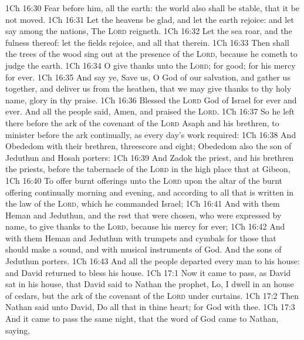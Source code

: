 \vs 1Ch 16:30 Fear before him, all the earth: the world also shall be stable, that it be not moved.
\vs 1Ch 16:31 Let the heavens be glad, and let the earth rejoice: and let  say among the nations, The \textsc{Lord} reigneth.
\vs 1Ch 16:32 Let the sea roar, and the fulness thereof: let the fields rejoice, and all that  therein.
\vs 1Ch 16:33 Then shall the trees of the wood sing out at the presence of the \textsc{Lord}, because he cometh to judge the earth.
\vs 1Ch 16:34 O give thanks unto the \textsc{Lord}; for  good; for his mercy  for ever.
\vs 1Ch 16:35 And say ye, Save us, O God of our salvation, and gather us together, and deliver us from the heathen, that we may give thanks to thy holy name,  glory in thy praise.
\vs 1Ch 16:36 Blessed  the \textsc{Lord} God of Israel for ever and ever. And all the people said, Amen, and praised the \textsc{Lord}.
\vs 1Ch 16:37 So he left there before the ark of the covenant of the \textsc{Lord} Asaph and his brethren, to minister before the ark continually, as every day's work required:
\vs 1Ch 16:38 And Obededom with their brethren, threescore and eight; Obededom also the son of Jeduthun and Hosah  porters:
\vs 1Ch 16:39 And Zadok the priest, and his brethren the priests, before the tabernacle of the \textsc{Lord} in the high place that  at Gibeon,
\vs 1Ch 16:40 To offer burnt offerings unto the \textsc{Lord} upon the altar of the burnt offering continually morning and evening, and  according to all that is written in the law of the \textsc{Lord}, which he commanded Israel;
\vs 1Ch 16:41 And with them Heman and Jeduthun, and the rest that were chosen, who were expressed by name, to give thanks to the \textsc{Lord}, because his mercy  for ever;
\vs 1Ch 16:42 And with them Heman and Jeduthun with trumpets and cymbals for those that should make a sound, and with musical instruments of God. And the sons of Jeduthun  porters.
\vs 1Ch 16:43 And all the people departed every man to his house: and David returned to bless his house.
\vs 1Ch 17:1 Now it came to pass, as David sat in his house, that David said to Nathan the prophet, Lo, I dwell in an house of cedars, but the ark of the covenant of the \textsc{Lord}  under curtains.
\vs 1Ch 17:2 Then Nathan said unto David, Do all that  in thine heart; for God  with thee.
\vs 1Ch 17:3 And it came to pass the same night, that the word of God came to Nathan, saying,
